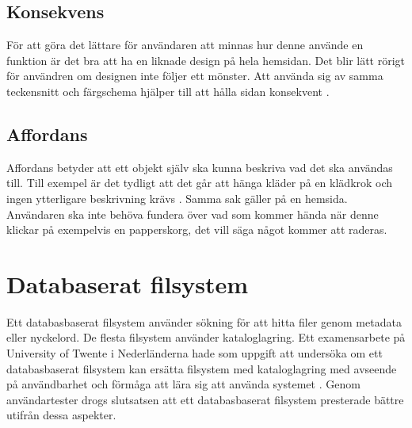 \subsection{Konsekvens}
För att göra det lättare för användaren att minnas hur denne använde en funktion är det bra att ha en liknade design på hela hemsidan. Det blir lätt rörigt för användren om designen inte följer ett mönster. Att använda sig av samma teckensnitt och färgschema hjälper till att hålla sidan konsekvent \cite{whitespace}.

\subsection{Affordans}
Affordans betyder att ett objekt själv ska kunna beskriva vad det ska användas till. Till exempel är det tydligt att det går att hänga kläder på en klädkrok och ingen ytterligare beskrivning krävs \cite{whitespace}. Samma sak gäller på en hemsida. Användaren ska inte behöva fundera över vad som kommer hända när denne klickar på exempelvis en papperskorg, det vill säga något kommer att raderas.

\section{Databaserat filsystem}
Ett databasbaserat filsystem använder sökning för att hitta filer genom metadata eller nyckelord. De flesta filsystem använder kataloglagring. Ett examensarbete på University of Twente i Nederländerna hade som uppgift att undersöka om ett databasbaserat filsystem kan ersätta filsystem med kataloglagring med avseende på användbarhet och förmåga att lära sig att använda systemet \cite{twente}. Genom användartester drogs slutsatsen att ett databasbaserat filsystem presterade bättre utifrån dessa aspekter.
